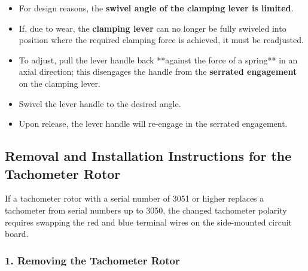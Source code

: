 \begin{itemize}
    \item For design reasons, the \textbf{swivel angle of the clamping lever  is limited}.
    \item If, due to wear, the \textbf{clamping lever } can no longer be fully swiveled into position where the required clamping force is achieved, it must be readjusted.
    \item To adjust, pull the lever handle back **against the force of a spring** in an axial direction; this disengages the handle from the \textbf{serrated engagement} on the clamping lever.
    \item Swivel the lever handle to the desired angle.
    \item Upon release, the lever handle will re-engage in the serrated engagement.
\end{itemize}



\setcounter{section}{60}

\subsection*{Removal and Installation Instructions for the Tachometer Rotor}


If a tachometer rotor with a serial number of 3051 or higher replaces a\\tachometer from serial numbers up to 3050,  
the changed tachometer polarity requires swapping the red and blue terminal wires on the side-mounted circuit board.

\subsubsection*{1. Removing the Tachometer Rotor}

